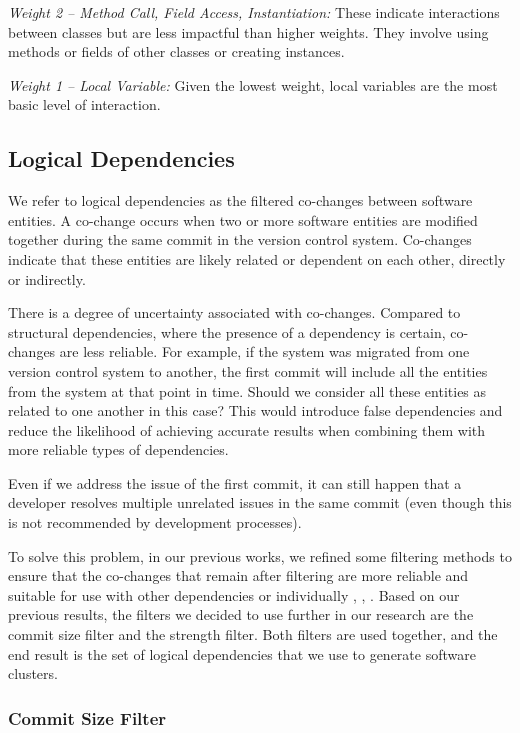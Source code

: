 \documentclass{ieeeaccess}
\begin{document}
\textit{Weight 2 – Method Call, Field Access, Instantiation:} These indicate interactions between classes but are less impactful than higher weights. They involve using methods or fields of other classes or creating instances.

\textit{Weight 1 – Local Variable:} Given the lowest weight, local variables are the most basic level of interaction.



\subsection{Logical Dependencies}
\label{subsec:ld}

We refer to logical dependencies as the filtered co-changes between software entities. A co-change occurs when two or more software entities are modified together during the same commit in the version control system. Co-changes indicate that these entities are likely related or dependent on each other, directly or indirectly.

There is a degree of uncertainty associated with co-changes. Compared to structural dependencies, where the presence of a dependency is certain, co-changes are less reliable. For example, if the system was migrated from one version control system to another, the first commit will include all the entities from the system at that point in time. Should we consider all these entities as related to one another in this case? This would introduce false dependencies and reduce the likelihood of achieving accurate results when combining them with more reliable types of dependencies.

Even if we address the issue of the first commit, it can still happen that a developer resolves multiple unrelated issues in the same commit (even though this is not recommended by development processes).

To solve this problem, in our previous works, we refined some filtering methods to ensure that the co-changes that remain after filtering are more reliable and suitable for use with other dependencies or individually \cite{b4}, \cite{b5}, \cite{b6}. Based on our previous results, the filters we decided to use further in our research are the commit size filter and the strength filter. Both filters are used together, and the end result is the set of logical dependencies that we use to generate software clusters.

\subsubsection{Commit Size Filter}
\end{document}
